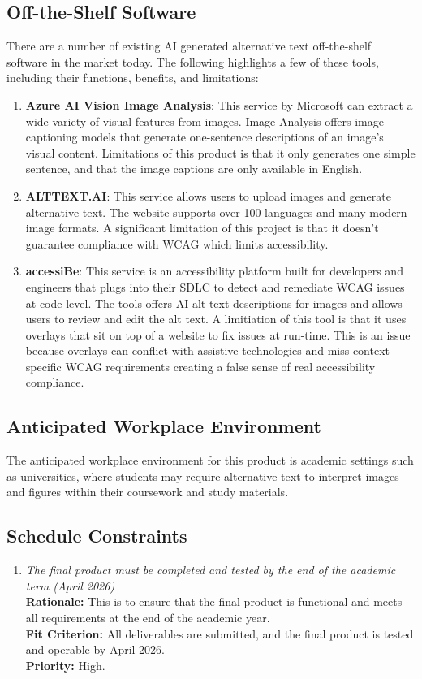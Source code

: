 \documentclass[12pt]{article}
\begin{document}
\subsection{Off-the-Shelf Software}
There are a number of existing AI generated alternative text
off-the-shelf software in the market today. The following
highlights a few of these tools, including their functions, benefits,
and limitations:
\begin{enumerate}
  \item \textbf{Azure AI Vision Image Analysis}: This service by
    Microsoft can extract a wide variety of
    visual features from images. Image Analysis offers image
    captioning models that generate one-sentence descriptions of an
    image's visual content.
    Limitations of this product is that it only generates one simple
    sentence, and that the image
    captions are only available in English.
  \item \textbf{ALTTEXT.AI}: This service allows users to upload
    images and generate alternative text. The website supports
    over 100 languages and many modern image formats. A significant
    limitation of this project
    is that it doesn't guarantee compliance with WCAG which limits
    accessibility.
  \item \textbf{accessiBe}: This service is an accessibility platform
    built for developers and engineers that plugs into their SDLC to detect and
    remediate WCAG issues at code level. The tools offers AI alt text
    descriptions for images and allows users to review
    and edit the alt text. A limitiation of this tool is that it uses
    overlays that sit on top of a website to fix issues at run-time.
    This is an issue
    because overlays can conflict with assistive technologies and
    miss context-specific WCAG requirements creating a false sense of
    real accessibility compliance.
\end{enumerate}
\subsection{Anticipated Workplace Environment}
The anticipated workplace environment for this product is academic
settings such as universities, where students may
require alternative text to interpret images and figures within their
coursework and study materials.
\subsection{Schedule Constraints}
\begin{enumerate}[label=MD-SC \arabic*., wide=0pt, leftmargin=*]
  \item \emph{The final product must be completed and tested by the
    end of the academic term (April 2026)}\\[2mm]
    {\bf Rationale:} This is to ensure that the final product is
    functional and meets all requirements
    at the end of the academic year.\\
    {\bf Fit Criterion:} All deliverables are submitted, and the
    final product is tested and operable by April 2026. \\
    {\bf Priority:} High.
\end{enumerate}
\end{document}

